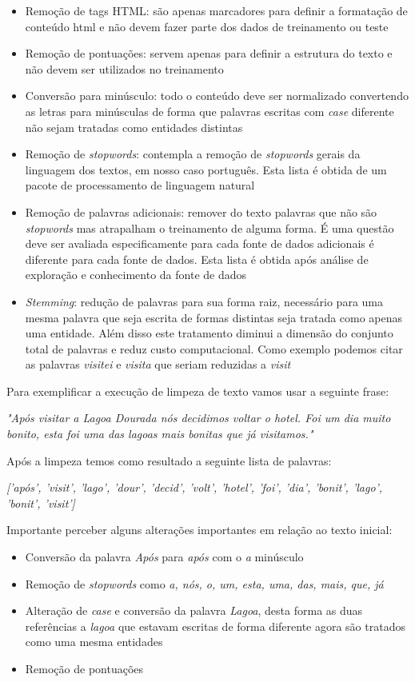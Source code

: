 \begin{itemize}
    \item Remoção de tags HTML: são apenas marcadores para definir a formatação de conteúdo html e não devem fazer parte dos dados de treinamento ou teste
    \item Remoção de pontuações: servem apenas para definir a estrutura do texto e não devem ser utilizados no treinamento
    \item Conversão para minúsculo: todo o conteúdo deve ser normalizado convertendo as letras para minúsculas de forma que palavras escritas com 
    \textit{case} diferente não sejam tratadas como entidades distintas
    \item Remoção de \textit{stopwords}: contempla a remoção de \textit{stopwords} gerais da linguagem dos textos, em nosso caso português. Esta lista é 
    obtida de um pacote de processamento de linguagem natural
    \item Remoção de palavras adicionais: remover do texto palavras que não são \textit{stopwords} mas atrapalham o treinamento de alguma forma. 
    É uma questão deve ser avaliada especificamente para cada fonte de dados
    adicionais é diferente para cada fonte de dados. Esta lista é obtida após análise de exploração e conhecimento da fonte de dados 
    \item \textit{Stemming}: redução de palavras para sua forma raiz, necessário para uma mesma palavra que seja escrita de formas distintas seja 
    tratada como apenas uma entidade. Além disso este tratamento diminui a dimensão do conjunto total de palavras e reduz custo computacional.
    Como exemplo podemos citar as palavras \textit{visitei} e \textit{visita} que seriam reduzidas a \textit{visit}
\end{itemize}

Para exemplificar a execução de limpeza de texto vamos usar a seguinte frase: 

\textit{"Após visitar a Lagoa Dourada nós decidimos voltar o hotel. Foi um dia muito bonito, esta foi uma das lagoas mais bonitas que já visitamos."}

Após a limpeza temos como resultado a seguinte lista de palavras: 

\textit{['após', 'visit', 'lago', 'dour', 'decid', 'volt', 'hotel', 'foi', 'dia', 'bonit', 'lago', 'bonit', 'visit']}

Importante perceber alguns alterações importantes em relação ao texto inicial:

\begin{itemize}
    \item Conversão da palavra \textit{Após} para \textit{após} com o \textit{a} minúsculo
    \item Remoção de \textit{stopwords} como \textit{a, nós, o, um, esta, uma, das, mais, que, já}
    \item Alteração de \textit{case} e conversão da palavra \textit{Lagoa}, desta forma as duas referências a \textit{lagoa} que estavam escritas de 
    forma diferente agora são tratados como uma mesma entidades
    \item Remoção de pontuações
\end{itemize}

